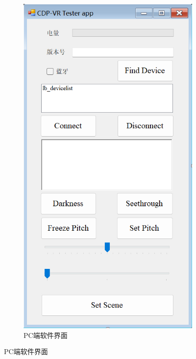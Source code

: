 \documentclass[a4paper,10pt]{article}
\begin{document}
		\begin{figure}[htbp] 
			\centering 
			\begin{subfigure}{0.23\textwidth}
				\includegraphics[width=\linewidth]{picture/VertiVR-CDP Tester UI}
				\captionsetup{font=scriptsize}
				\caption{PC端软件界面}
				\label{fig:vertivr-cdp-tester-ui}
			\end{subfigure}

\end{figure}
\end{document}
